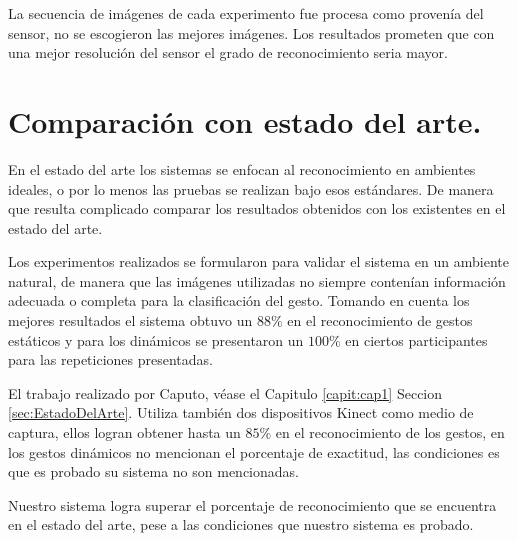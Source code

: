 La secuencia de imágenes de cada experimento fue procesa como provenía del sensor, no se escogieron las mejores imágenes. Los resultados prometen que con una mejor resolución del sensor el grado de reconocimiento seria mayor. 

\section{Comparación con estado del arte.}  

En el estado del arte los sistemas se enfocan al reconocimiento en ambientes ideales, o por lo menos las pruebas se realizan bajo esos estándares. De manera que resulta complicado comparar los resultados obtenidos con los existentes en el estado del arte.

Los experimentos realizados se formularon para validar el sistema en un ambiente natural, de manera que las imágenes utilizadas no siempre contenían información adecuada o completa para la clasificación del gesto. Tomando en cuenta los mejores resultados el sistema obtuvo un $88 \%$ en el reconocimiento de gestos estáticos y para los dinámicos se presentaron un $100 \%$ en ciertos participantes para las repeticiones presentadas. 

El trabajo realizado por Caputo, véase el Capitulo \ref{capit:cap1} Seccion \ref{sec:EstadoDelArte}. Utiliza también dos dispositivos Kinect como medio de captura, ellos logran obtener hasta un $85 \%$ en el reconocimiento de los gestos, en los gestos dinámicos no mencionan el porcentaje de exactitud, las condiciones es que es probado su sistema no son mencionadas. 

Nuestro sistema logra superar el porcentaje de reconocimiento que se encuentra en el estado del arte, pese a las condiciones que nuestro sistema es probado.  


\newpage